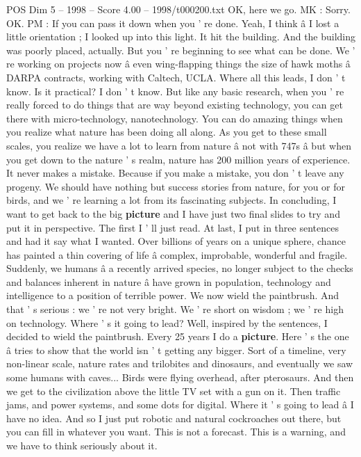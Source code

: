 \begin{textsample}{POS Dim 5 – 1998 – Score 4.00 – 1998/t000200.txt}
OK, here we go.
MK : Sorry.
OK.
PM : If you can pass it down when you ' re done.
Yeah, I think â I lost a little orientation ; I looked up into this light.
It hit the building.
And the building was poorly placed, actually.
But you ' re beginning to see what can be done.
We ' re working on projects now â even wing-flapping things the size of hawk moths â DARPA contracts, working with Caltech, UCLA.
Where all this leads, I don ' t know.
Is it practical?
I don ' t know.
But like any basic research, when you ' re really forced to do things that are way beyond existing technology, you can get there with micro-technology, nanotechnology.
You can do amazing things when you realize what nature has been doing all along.
As you get to these small scales, you realize we have a lot to learn from nature â not with 747s â but when you get down to the nature ' s realm, nature has 200 million years of experience.
It never makes a mistake.
Because if you make a mistake, you don ' t leave any progeny.
We should have nothing but success stories from nature, for you or for birds, and we ' re learning a lot from its fascinating subjects.
In concluding, I want to get back to the big \textbf{picture} and I have just two final slides to try and put it in perspective.
The first I ' ll just read.
At last, I put in three sentences and had it say what I wanted.
Over billions of years on a unique sphere, chance has painted a thin covering of life â complex, improbable, wonderful and fragile.
Suddenly, we humans â a recently arrived species, no longer subject to the checks and balances inherent in nature â have grown in population, technology and intelligence to a position of terrible power.
We now wield the paintbrush.
And that ' s serious : we ' re not very bright.
We ' re short on wisdom ; we ' re high on technology.
Where ' s it going to lead?
Well, inspired by the sentences, I decided to wield the paintbrush.
Every 25 years I do a \textbf{picture}.
Here ' s the one â tries to show that the world isn ' t getting any bigger.
Sort of a timeline, very non-linear scale, nature rates and trilobites and dinosaurs, and eventually we saw some humans with caves...
Birds were flying overhead, after pterosaurs.
And then we get to the civilization above the little TV set with a gun on it.
Then traffic jams, and power systems, and some dots for digital.
Where it ' s going to lead â I have no idea.
And so I just put robotic and natural cockroaches out there, but you can fill in whatever you want.
This is not a forecast.
This is a warning, and we have to think seriously about it.

\end{textsample}
